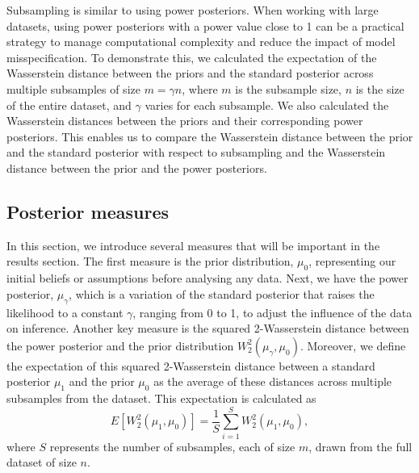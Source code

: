 \documentclass[12pt]{article}
\begin{document}
Subsampling is similar to using power posteriors. When working with large datasets, using power posteriors with a power value close to 1 can be a practical strategy to manage computational complexity and reduce the impact of model misspecification. To demonstrate this, we calculated the expectation of the Wasserstein distance between the priors and the standard posterior across multiple subsamples of size $m= \gamma n$, where $m$ is the subsample size, $n$ is the size of the entire dataset, and $\gamma$ varies for each subsample. We also calculated the Wasserstein distances between the priors and their corresponding power posteriors. This enables us to compare the Wasserstein distance between the prior and the standard posterior with respect to subsampling and the Wasserstein distance between the prior and the power posteriors.

\subsection{Posterior measures}
In this section, we introduce several measures that will be important in the results section. The first measure is the prior distribution, $\mu_0$, representing our initial beliefs or assumptions before analysing any data. Next, we have the power posterior, $\mu_{\gamma}$, which is a variation of the standard posterior that raises the likelihood to a constant $\gamma$, ranging from 0 to 1, to adjust the influence of the data on inference. Another key measure is the squared 2-Wasserstein distance between the power posterior and the prior distribution $W_2^2(\mu_{\gamma}, \mu_0)$. Moreover, we define the expectation of 
this squared 2-Wasserstein distance between a standard posterior $\mu_1$ and the prior $\mu_0$ as the average of these distances across multiple subsamples from the dataset. This expectation is calculated as  \begin{equation}
	E [W_2^2(\mu_1, \mu_0)] = \frac{1}{S}\sum_{i=1}^{S} W_2^2(\mu_1, \mu_0),
	\label{eq:wasser_ex}
\end{equation}
where $S$ represents the number of subsamples, each of size $m$, drawn from the full dataset of size $n$. 
 
\end{document}
